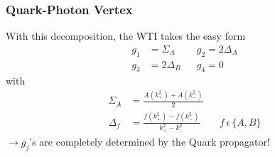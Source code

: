 \begin{frame}\frametitle{Quark-Photon Vertex}
With this decomposition, the WTI takes the easy form 
%
\begin{align}
g_1 &= \Sigma_A && g_2=2\Delta_A \\\nonumber
g_3&= 2\Delta_B && g_4=0
\end{align}
%
with 
%
\begin{align}
\Sigma_A&=\frac{A(k_+^2) + A(k_-^2)}{2} \\\nonumber
\Delta_f&=\frac{f(k_+^{2}) - f(k_-^2)}{k_+^2 - k_{-}^2} && f\, \epsilon \, \lbrace A,B \rbrace 
\end{align}
%
$\rightarrow g_j$'s are completely determined by the Quark propagator!
\end{frame}


\endinput
